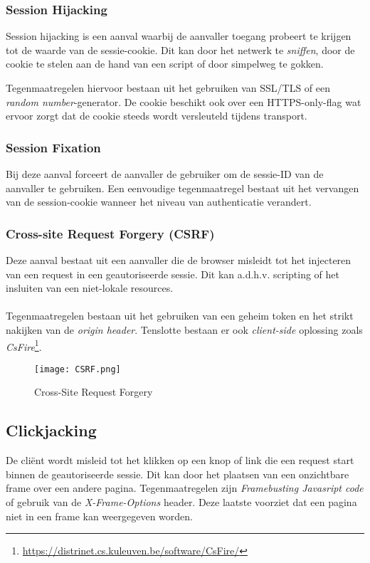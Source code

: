 \documentclass[../main.tex]{subfiles}
\begin{document}
\subsubsection{Session Hijacking}
Session hijacking is een aanval waarbij de aanvaller toegang probeert te krijgen tot de waarde van de sessie-cookie. Dit kan door het netwerk te \textit{sniffen}, door de cookie te stelen aan de hand van een script of door simpelweg  te gokken.

Tegenmaatregelen hiervoor bestaan uit het gebruiken van SSL/TLS of een \textit{random number}-generator. De cookie beschikt ook over een HTTPS-only-flag wat ervoor zorgt dat de cookie steeds wordt versleuteld tijdens transport.

\subsubsection{Session Fixation}
Bij deze aanval forceert de aanvaller de gebruiker om de sessie-ID van de aanvaller te gebruiken. Een eenvoudige tegenmaatregel bestaat uit het vervangen van de session-cookie wanneer het niveau van authenticatie verandert.

\subsubsection{Cross-site Request Forgery (CSRF)}
Deze aanval bestaat uit een aanvaller die de browser misleidt tot het injecteren van een request in een geautoriseerde sessie. Dit kan a.d.h.v. scripting of het insluiten van een niet-lokale resources.
\\\\
Tegenmaatregelen bestaan uit het gebruiken van een geheim token en het strikt nakijken van de \textit{origin header}.
Tenslotte bestaan er ook \textit{client-side} oplossing zoals \textit{CsFire}\footnote{\url{https://distrinet.cs.kuleuven.be/software/CsFire/}}.

\begin{figure}[h!]
    \centering
    \texttt{[image: CSRF.png]}
    \caption{Cross-Site Request Forgery}
    \label{fig:awesome_image}
\end{figure}

\subsection{Clickjacking}
De cli\"ent wordt misleid tot het klikken op een knop of link die een request start binnen de geautoriseerde sessie. Dit kan door het plaatsen van een onzichtbare frame over een andere pagina. Tegenmaatregelen zijn \textit{Framebusting Javasript code} of gebruik van de \textit{X-Frame-Options} header. Deze laatste voorziet dat een pagina niet in een frame kan weergegeven worden.
\end{document}

